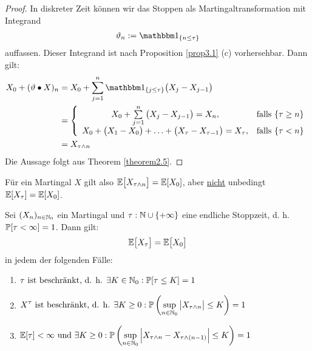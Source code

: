 \begin{proof}
	In diskreter Zeit können wir das Stoppen als Martingaltransformation mit Integrand
	\begin{align*}
		\vartheta_n:=\indi_{\lbrace n\leq\tau\rbrace}
	\end{align*}
	auffassen. Dieser Integrand ist nach Proposition \ref{prop3.1} (c) vorhersehbar. Dann gilt:
	\begin{align*}
		X_0+(\vartheta\bullet X)_n&=
		X_0+\sum\limits_{j=1}^n\indi_{\lbrace j\leq\tau\rbrace}\big(X_j-X_{j-1}\big)\\
		&=\left\lbrace\begin{array}{cl}
			X_0+\sum\limits_{j=1}^n\big(X_j-X_{j-1}\big)=X_n,&\falls\lbrace\tau\geq n\rbrace\\
			X_0+\big(X_1-X_0\big)+\ldots+\big(X_\tau-X_{\tau-1}\big)=X_\tau, &\falls \lbrace\tau<n\rbrace
		\end{array}\right.\\
		&=X_{\tau\wedge n}
	\end{align*}
	Die Aussage folgt aus Theorem \ref{theorem2.5}.
\end{proof}

\begin{bemerkung}
	Für ein Martingal $X$ gilt also $\E\big[X_{\tau\wedge n}\big]=\E[X_0]$, aber \ul{nicht} unbedingt $\E[X_\tau]=\E[X_0]$.
\end{bemerkung}

\begin{theorem}\enter\label{theorem3.3}
	Sei $(X_n)_{n\in\N_0}$ ein Martingal und $\tau:\N\cup\lbrace+\infty\rbrace$ eine endliche Stoppzeit, d. h. $\P[\tau<\infty]=1$. Dann gilt:
	\begin{align}\label{eqTheorem3.3}
		\E\big[X_\tau\big]=\E\big[X_0\big]
	\end{align}
	in jedem der folgenden Fälle:
	\begin{enumerate}[label=\alph*)]
		\item $\begin{aligned}
			\tau\text{ ist beschränkt, d. h. }\exists K\in\N_0:\P[\tau\leq K]=1
		\end{aligned}$
		\item $
		\begin{aligned}
			X^\tau\text{ ist beschränkt, d. h. }\exists K\geq0:\P\left(\sup\limits_{n\in\N_0}\big| X_{\tau\wedge n}\big|\leq K\right)=1
		\end{aligned}$
		\item $\begin{aligned}
			\E[\tau]<\infty\text{ und }\exists K\geq0:\P\left(\sup\limits_{n\in\N_0}\Big|X_{\tau\wedge n}-X_{\tau\wedge(n-1)}\Big|\leq K\right)=1
		\end{aligned}$
	\end{enumerate}
\end{theorem}

